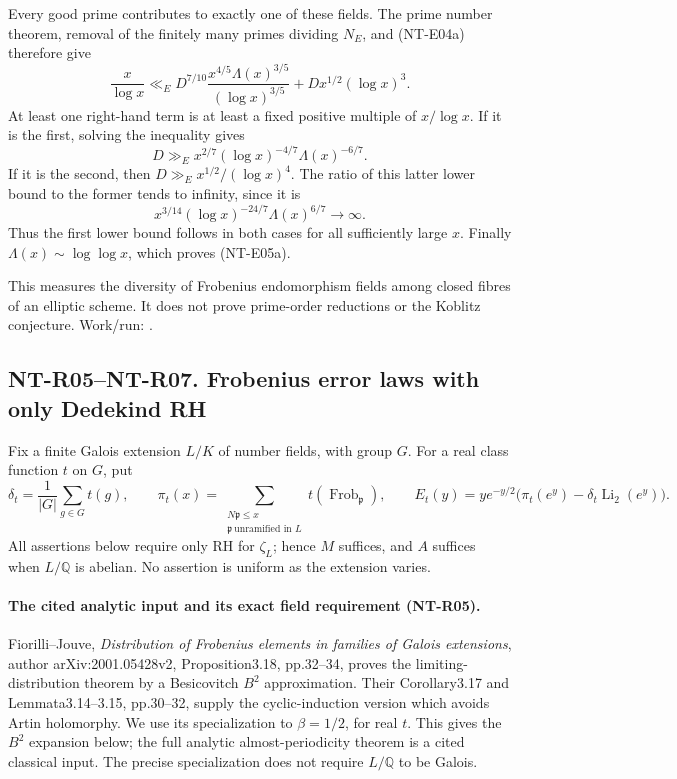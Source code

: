 \documentclass[11pt,a4paper]{article}
\begin{document}
Every good prime contributes to exactly one of these fields.
The prime number theorem, removal of the finitely many primes
dividing $N_E$, and (NT-E04a) therefore give
\[
 \frac{x}{\log x}\ll_E
    D^{7/10}\frac{x^{4/5}\Lambda(x)^{3/5}}{(\log x)^{3/5}}
                      +D x^{1/2}(\log x)^3.               \tag{NT-E05c}
\]
At least one right-hand term is at least a fixed positive
multiple of $x/\log x$. If it is the first, solving the
inequality gives
\[
 D\gg_E x^{2/7}(\log x)^{-4/7}\Lambda(x)^{-6/7}.
\]
If it is the second, then $D\gg_E x^{1/2}/(\log x)^4$.
The ratio of this latter lower bound to the former tends to
infinity, since it is
\[
 x^{3/14}(\log x)^{-24/7}\Lambda(x)^{6/7}\longrightarrow\infty.
\]
Thus the first lower bound follows in both cases for all
sufficiently large $x$. Finally
$\Lambda(x)\sim\log\log x$, which proves (NT-E05a).

This measures the diversity of Frobenius endomorphism fields
among closed fibres of an elliptic scheme. It does not prove
prime-order reductions or the Koblitz conjecture. Work/run:
.

\subsection*{NT-R05--NT-R07. Frobenius error laws with only Dedekind RH}

Fix a finite Galois extension $L/K$ of number fields, with group $G$.
For a real class function $t$ on $G$, put
\[
 \delta_t=\frac1{|G|}\sum_{g\in G}t(g),\qquad
 \pi_t(x)=\sum_{\substack{N\mathfrak p\le x\\\mathfrak p\ \text{unramified in }L}}
 t(\operatorname{Frob}_{\mathfrak p}),\qquad
 E_t(y)=ye^{-y/2}\bigl(\pi_t(e^y)-\delta_t\operatorname{Li}_2(e^y)\bigr).
\]
All assertions below require only RH for $\zeta_L$; hence $M$ suffices,
and $A$ suffices when $L/\mathbb Q$ is abelian. No assertion is uniform
as the extension varies.

\paragraph{The cited analytic input and its exact field requirement (NT-R05).}
Fiorilli--Jouve, \emph{Distribution of Frobenius elements in families of
Galois extensions}, author arXiv:2001.05428v2, Proposition3.18,
pp.32--34, proves the limiting-distribution theorem by a
Besicovitch $B^2$ approximation. Their Corollary3.17 and
Lemmata3.14--3.15, pp.30--32, supply the cyclic-induction version
which avoids Artin holomorphy. We use its specialization to
$\beta=1/2$, for real $t$. This gives the $B^2$ expansion below;
the full analytic almost-periodicity theorem is a cited classical
input. The precise specialization does not require $L/\mathbb Q$
to be Galois.
\end{document}
